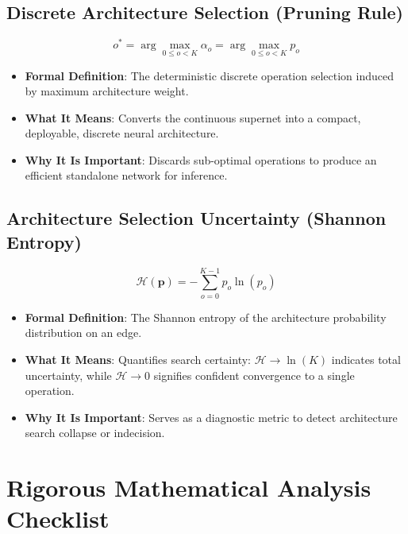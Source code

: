 \documentclass[11pt,a4paper]{article}
\theoremstyle{definition}
\begin{document}
\subsection{Discrete Architecture Selection (Pruning Rule)}
{\boldmath
\begin{equation}
o^* = \arg\max_{0 \le o < K} \alpha_o = \arg\max_{0 \le o < K} p_o
\end{equation}
}
\begin{itemize}
    \item \textbf{Formal Definition}: The deterministic discrete operation selection induced by maximum architecture weight.
    \item \textbf{What It Means}: Converts the continuous supernet into a compact, deployable, discrete neural architecture.
    \item \textbf{Why It Is Important}: Discards sub-optimal operations to produce an efficient standalone network for inference.
\end{itemize}

\subsection{Architecture Selection Uncertainty (Shannon Entropy)}
{\boldmath
\begin{equation}
\mathcal{H}(\mathbf{p}) = - \sum_{o=0}^{K-1} p_o \ln(p_o)
\end{equation}
}
\begin{itemize}
    \item \textbf{Formal Definition}: The Shannon entropy of the architecture probability distribution on an edge.
    \item \textbf{What It Means}: Quantifies search certainty: $\mathcal{H} \to \ln(K)$ indicates total uncertainty, while $\mathcal{H} \to 0$ signifies confident convergence to a single operation.
    \item \textbf{Why It Is Important}: Serves as a diagnostic metric to detect architecture search collapse or indecision.
\end{itemize}

\section{Rigorous Mathematical Analysis Checklist}
\end{document}

